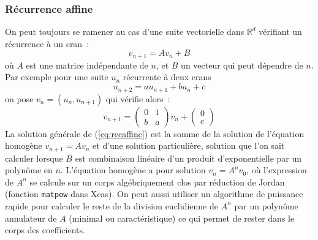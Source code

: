 \documentclass[a4paper,11pt]{article}
\newcommand{\R}{{\mathbb{R}}}
\begin{document}
\subsubsection{Récurrence affine}
On peut toujours se ramener au cas d'une suite vectorielle dans $\R^d$
vérifiant un récurrence à un cran~:
\begin{equation} v_{n+1} = A v_n + B \label{eq:recaffine}
\end{equation}
où $A$ est une matrice indépendante de $n$, et $B$ un vecteur qui peut
dépendre de $n$.
Par exemple pour une suite $u_n$ récurrente à deux crans
\[ u_{n+2}=au_{n+1}+bu_n+c\]
on pose $v_n=(u_n,u_{n+1})$ qui vérifie alors~:
\[ v_{n+1}= \left( \begin{array}{cc} 0 & 1 \\ b & a \end{array}\right) v_n + 
\left( \begin{array}{c}0 \\ c\end{array}\right)\] 
La solution générale de (\ref{eq:recaffine}) est la somme de la solution
de l'équation homogène $v_{n+1}=Av_n$ et d'une solution particulière,
solution que l'on sait calculer lorsque $B$ est combinaison linéaire
d'un produit d'exponentielle par un polynôme en $n$.
L'équation homogène a pour solution $v_n=A^n v_0$, où l'expression de $A^n$
se calcule sur un corps algébriquement clos par réduction de Jordan
(fonction \verb|matpow| dans Xcas). On peut aussi utiliser un algorithme
de puissance rapide pour calculer le reste de la division euclidienne
de $A^n$ par un polynôme annulateur de $A$ (minimal ou caractéristique)
ce qui permet de rester dans le corps des coefficients.
\end{document}
